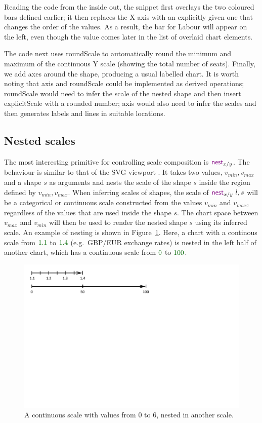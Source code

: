 \documentclass{jfp}
\newcommand{\num}[1]{\textcolor{numclr}{#1}}
\newcommand{\strf}[1]{\textnormal{\textcolor{strclr}{\sffamily #1}}}
\newcommand{\kvd}[1]{\textnormal{\textcolor{kvdclr}{\sffamily #1}}}
\begin{document}
\noindent
Reading the code from the inside out, the snippet first overlays the two coloured bars defined
earlier; it then replaces the X axis with an explicitly given one that changes the order of the
values. As a result, the bar for \strf{Labour} will appear on the left, even though the value
comes later in the list of overlaid chart elements.

The code next uses \kvd{roundScale} to automatically round the minimum and maximum of the
continuous Y scale (showing the total number of seats). Finally, we add axes around the shape,
producing a usual labelled chart.  It is worth noting that \kvd{axis} and \kvd{roundScale}
could be implemented as derived operations; \kvd{roundScale} would need to infer the scale of
the nested shape and then insert \kvd{explicitScale} with a rounded number; \kvd{axis}
would also need to infer the scales and then generates labels and lines in suitable locations.

\subsection{Nested scales}

The most interesting primitive for controlling scale composition
is $\kvd{nest}_{x/y}$. The behaviour is similar to that of the SVG viewport \cite{svg}.
It takes two values, $v_{min}, v_{max}$ and a shape $s$ as arguments and
nests the scale of the shape $s$ inside the region defined by $v_{min}, v_{max}$.
When inferring scales of shapes, the scale of $\kvd{nest}_{x/y}~l, s$ will be a categorical or continuous scale
constructed from the values $v_{min}$ and $v_{max}$, regardless of the values that are used inside
the shape $s$. The chart space between $v_{max}$ and $v_{min}$ will then be used to render the
nested shape $s$ using its inferred scale. An example of nesting is shown in Figure~\ref{fig:nesting}.
Here, a chart with a continous scale from $\num{1.1}$ to $\num{1.4}$ (e.g.~GBP/EUR exchange rates)
is nested in the left half of another chart, which has a continuous scale from $\num{0}$ to $\num{100}$.

\begin{figure}
\includegraphics[scale=1,trim={0cm 7.5cm 6cm 0cm},clip]{figures/nest}
\caption{A continuous scale with values from $0$ to $6$, nested in another scale.}
\label{fig:nesting}
\end{figure}
\end{document}
